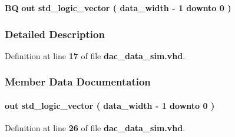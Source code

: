 \begin{DoxyCompactItemize}
\item 
{\bf BQ}  {\bfseries {\bfseries \textcolor{keywordflow}{out}\textcolor{vhdlchar}{ }}} {\bfseries \textcolor{comment}{std\+\_\+logic\+\_\+vector}\textcolor{vhdlchar}{ }\textcolor{vhdlchar}{(}\textcolor{vhdlchar}{ }\textcolor{vhdlchar}{ }\textcolor{vhdlchar}{ }\textcolor{vhdlchar}{ }{\bfseries {\bf data\+\_\+width}} \textcolor{vhdlchar}{-\/}\textcolor{vhdlchar}{ } \textcolor{vhdldigit}{1} \textcolor{vhdlchar}{ }\textcolor{keywordflow}{downto}\textcolor{vhdlchar}{ }\textcolor{vhdlchar}{ } \textcolor{vhdldigit}{0} \textcolor{vhdlchar}{ }\textcolor{vhdlchar}{)}\textcolor{vhdlchar}{ }} 
\end{DoxyCompactItemize}


\subsubsection{Detailed Description}


Definition at line {\bf 17} of file {\bf dac\+\_\+data\+\_\+sim.\+vhd}.



\subsubsection{Member Data Documentation}
\paragraph[{AI}]{ {\bfseries \textcolor{keywordflow}{out}\textcolor{vhdlchar}{ }} {\bfseries \textcolor{comment}{std\+\_\+logic\+\_\+vector}\textcolor{vhdlchar}{ }\textcolor{vhdlchar}{(}\textcolor{vhdlchar}{ }\textcolor{vhdlchar}{ }\textcolor{vhdlchar}{ }\textcolor{vhdlchar}{ }{\bfseries {\bf data\+\_\+width}} \textcolor{vhdlchar}{-\/}\textcolor{vhdlchar}{ } \textcolor{vhdldigit}{1} \textcolor{vhdlchar}{ }\textcolor{keywordflow}{downto}\textcolor{vhdlchar}{ }\textcolor{vhdlchar}{ } \textcolor{vhdldigit}{0} \textcolor{vhdlchar}{ }\textcolor{vhdlchar}{)}\textcolor{vhdlchar}{ }} \hspace{0.3cm}{\ttfamily [Port]}}\label{classdac__data__sim_aa8524f5c0472fef471ba70066b68cd0c}


Definition at line {\bf 26} of file {\bf dac\+\_\+data\+\_\+sim.\+vhd}.

